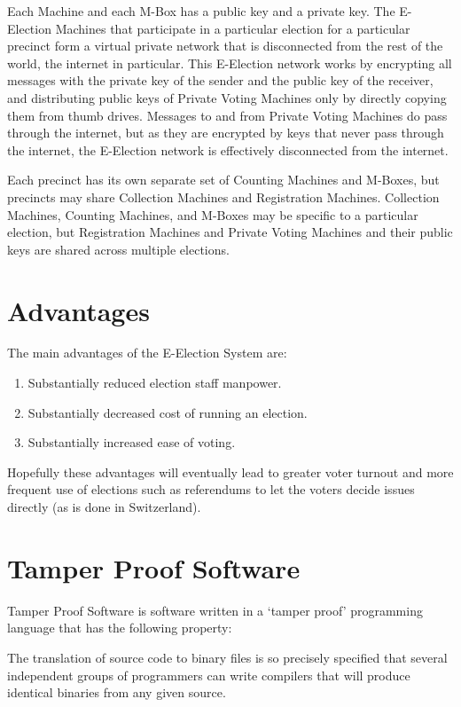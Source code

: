 \documentclass[12pt]{article}
\newenvironment{indpar}[1][0.3in]%
	{\begin{list}{}%
		     {\setlength{\itemsep}{0in}%
		      \setlength{\topsep}{0in}%
		      \setlength{\parsep}{1ex}%
		      \setlength{\labelwidth}{#1}%
		      \setlength{\leftmargin}{#1}%
		      \addtolength{\leftmargin}{\labelsep}}%
	 \item}%
	{\end{list}}
\begin{document}
Each Machine and each M-Box has a public key and a private key.
The E-Election Machines that participate in
a particular election for a particular
precinct form a virtual private network that is disconnected from
the rest of the world, the internet in particular.  This E-Election
network works by encrypting all messages with the private key of the
sender and the public key of the receiver, and distributing public
keys of Private Voting Machines only by directly copying them from
thumb drives.  Messages to and from Private Voting Machines do pass
through the internet, but as they are encrypted by keys that never
pass through the internet, the E-Election network is effectively
disconnected from the internet.

Each precinct has its own separate set of Counting Machines and M-Boxes,
but precincts may share Collection Machines and Registration
Machines.  Collection Machines,
Counting Machines, and M-Boxes may be
specific to a particular election, but Registration Machines
and Private Voting Machines and
their public keys are shared across multiple elections.

\section{Advantages}

The main advantages of the E-Election System are:
\begin{enumerate}
\item Substantially reduced election staff manpower.
\item Substantially decreased cost of running an election.
\item Substantially increased ease of voting.
\end{enumerate}

Hopefully these advantages will eventually lead to
greater voter turnout and more frequent use of elections such
as referendums to let the voters decide issues directly
(as is done in Switzerland).


\section{Tamper Proof Software}

Tamper Proof Software is software written in a `tamper proof'
programming language
that has the following property:
\begin{indpar}
The translation of source code to binary files is so precisely
specified that several independent groups of programmers can
write compilers that will produce identical binaries from any
given source.
\end{indpar}
\end{document}
